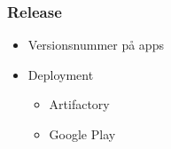 \begin{frame}
    \frametitle{Release}
    \begin{itemize}
    \item Versionsnummer på apps
    \item Deployment
      \begin{itemize}
      \item Artifactory
      \item Google Play
      \end{itemize}
    \end{itemize}
  \end{frame}
